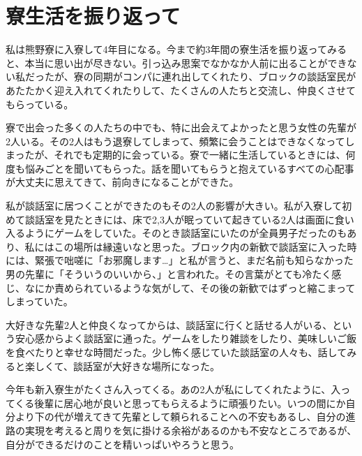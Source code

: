 \section{寮生活を振り返って}
私は熊野寮に入寮して4年目になる。今まで約3年間の寮生活を振り返ってみると、本当に思い出が尽きない。引っ込み思案でなかなか人前に出ることができない私だったが、寮の同期がコンパに連れ出してくれたり、ブロックの談話室民があたたかく迎え入れてくれたりして、たくさんの人たちと交流し、仲良くさせてもらっている。
\par 寮で出会った多くの人たちの中でも、特に出会えてよかったと思う女性の先輩が2人いる。その2人はもう退寮してしまって、頻繁に会うことはできなくなってしまったが、それでも定期的に会っている。寮で一緒に生活しているときには、何度も悩みごとを聞いてもらった。話を聞いてもらうと抱えているすべての心配事が大丈夫に思えてきて、前向きになることができた。
\par 私が談話室に居つくことができたのもその2人の影響が大きい。私が入寮して初めて談話室を見たときには、床で2,3人が眠っていて起きている2人は画面に食い入るようにゲームをしていた。そのとき談話室にいたのが全員男子だったのもあり、私にはこの場所は縁遠いなと思った。ブロック内の新歓で談話室に入った時には、緊張で咄嗟に「お邪魔します…」と私が言うと、まだ名前も知らなかった男の先輩に「そういうのいいから、」と言われた。その言葉がとても冷たく感じ、なにか責められているような気がして、その後の新歓ではずっと縮こまってしまっていた。
\par 大好きな先輩2人と仲良くなってからは、談話室に行くと話せる人がいる、という安心感からよく談話室に通った。ゲームをしたり雑談をしたり、美味しいご飯を食べたりと幸せな時間だった。少し怖く感じていた談話室の人々も、話してみると楽しくて、談話室が大好きな場所になった。
\par 今年も新入寮生がたくさん入ってくる。あの2人が私にしてくれたように、入ってくる後輩に居心地が良いと思ってもらえるように頑張りたい。いつの間にか自分より下の代が増えてきて先輩として頼られることへの不安もあるし、自分の進路の実現を考えると周りを気に掛ける余裕があるのかも不安なところであるが、自分ができるだけのことを精いっぱいやろうと思う。
